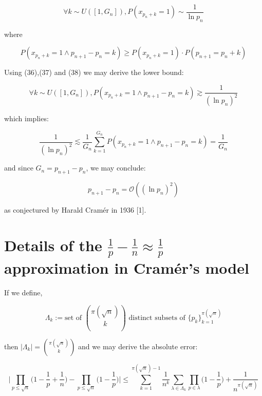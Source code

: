 \documentclass{article}
\newcommand{\gsim}{\gtrsim}
\newcommand{\lsim}{\lesssim}
\begin{document}
\begin{equation}
\forall k \sim U([1,G_n]),P(x_{p_n + k} = 1) \sim \frac{1}{\ln p_n}
\end{equation}

where

\begin{equation}
P(x_{p_n + k} = 1 \land p_{n+1}-p_n = k) \geq P(x_{p_n + k} = 1) \cdot P(p_{n+1} = p_n + k)
\end{equation}

Using (36),(37) and (38) we may derive the lower bound:

\begin{equation}
\forall k \sim U([1,G_n]),P(x_{p_n + k} = 1 \land p_{n+1}-p_n = k) \gsim \frac{1}{(\ln p_n)^2}
\end{equation}

which implies:

\begin{equation}
\frac{1}{(\ln p_n)^2} \lsim \frac{1}{G_n} \sum_{k=1}^{G_n} P(x_{p_n + k} = 1 \land p_{n+1}-p_n = k) = \frac{1}{G_n}
\end{equation}

and since $G_n = p_{n+1}-p_n$, we may conclude:

\begin{equation}
p_{n+1}-p_n = \mathcal{O}((\ln p_n)^2)
\end{equation}

as conjectured by Harald Cramér in 1936 [1].

\newpage

\section{Details of the $\frac{1}{p} - \frac{1}{n} \approx \frac{1}{p}$ approximation in Cramér's model}

If we define,

\begin{equation}
\Lambda_k := \text{set of } {\pi(\sqrt{n}) \choose k} \text{ distinct subsets of } \{p_k\}_{k=1}^{\pi(\sqrt{n})}
\end{equation}

then $\lvert \Lambda_k \rvert = {\pi(\sqrt{n}) \choose k}$ and we may derive the absolute error:

\begin{equation}
\Big\lvert \prod_{p \leq \sqrt{n}} \big(1-\frac{1}{p} + \frac{1}{n}) - \prod_{p \leq \sqrt{n}} \big(1-\frac{1}{p}\big) \Big\rvert \leq \sum_{k=1}^{\pi(\sqrt{n})-1} \frac{1}{n^k} \sum_{\lambda \in \Lambda_k} \prod_{p \in \lambda} \big(1-\frac{1}{p}\big) + \frac{1}{n^{\pi(\sqrt{n})}}
\end{equation}
\end{document}
